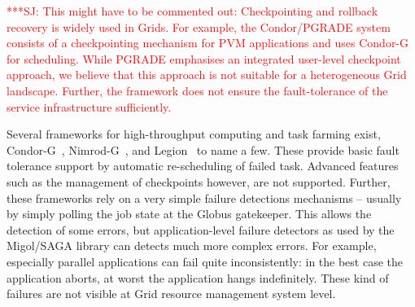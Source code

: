 \documentclass[times, 10pt, twocolumn]{article}
\newcommand{\jhanote}[1]{ {\textcolor{red} { ***SJ: #1 }}}
\newcommand{\jhanote}[1]{}
\begin{document}



\jhanote{This might have to be commented out: Checkpointing and
  rollback recovery is widely used in Grids. For example, the
  Condor/PGRADE system~\cite{DBLP:conf/eagc/KovacsK04} consists of a
  checkpointing mechanism for PVM applications and uses
  Condor-G~\cite{citeulike:291860} for scheduling.  While PGRADE
  emphasises an integrated user-level checkpoint approach, we believe
  that this approach is not suitable for a heterogeneous Grid
  landscape. Further, the framework does not ensure the
  fault-tolerance of the service infrastructure sufficiently.}
                                 





Several frameworks for high-throughput computing and task farming
exist, Condor-G~\cite{citeulike:291860},
Nimrod-G~\cite{buyya00nimrodg}, and Legion~\cite{689541} to name a
few. These provide basic fault tolerance support by automatic
re-scheduling of failed task. Advanced features such as the management
of checkpoints however, are not supported. Further, these frameworks
rely on a very simple failure detections mechanisms -- usually by
simply polling the job state at the Globus gatekeeper. This allows the
detection of some errors, but application-level failure detectors as
used by the Migol/SAGA library can detects much more complex
errors. For example, especially parallel applications can fail quite
inconsistently: in the best case the application aborts, at worst the
application hangs indefinitely. These kind of failures are not visible
at Grid resource management system level.
\end{document}
